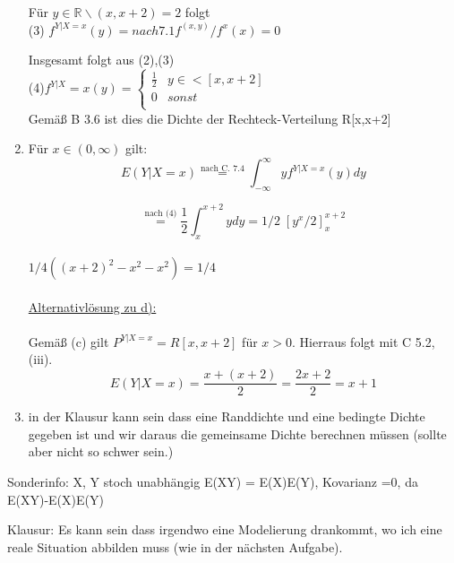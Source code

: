\documentclass[10pt,a4paper]{article}
\begin{document}
\begin{enumerate}[label=(\alph*)]
Für $y \in \mathbb{R} \backslash  (x, x+2) = 2$ folgt\\
(3) $f^{Y|X=x}(y) = nach 7.1 f^(x,y)/f^x(x) = 0$

Insgesamt folgt aus (2),(3)\\

(4)$f^{Y|X}=x(y) =  \begin{cases}
	\frac{1}{2} &  y \in <[x,x+2]\\
	0 & sonst\\
\end{cases}$\\

Gemäß B 3.6 ist dies die Dichte der Rechteck-Verteilung R[x,x+2]

\item Für $x\in (0,\infty)$ gilt:\\
$$E(Y|X=x) \overset{\text{nach C. 7.4}}{=}  \int_{-\infty}^{\infty} y f^{Y|X=x}(y)dy$$

$$\overset{\text{nach (4)}}{=}  \frac{1}{2}  \int_{x}^{x+2}y dy = 1/2\;\left[y^x /2\right]^{x+2}_x $$\\

$1/4((x+2)^2-x^2 - x^2) =  1/4$\\~\\
\underline{Alternativlösung zu d):}\\~\\
 	Gemäß (c) gilt $P^{Y|X=x} = R[x,x+2]$ für $x>0$. Hierraus folgt mit C 5.2, (iii). $$E(Y|X=x) = \frac{x+(x+2)}{2} = \frac{2x+2}{2}=x+1$$
	
	\item in der Klausur kann sein dass eine Randdichte und eine bedingte Dichte gegeben ist und wir daraus die gemeinsame Dichte berechnen müssen (sollte aber nicht so schwer sein.)
\end{enumerate}


Sonderinfo: X, Y stoch unabhängig E(XY) =  E(X)E(Y), Kovarianz =0, da E(XY)-E(X)E(Y)

Klausur: Es kann sein dass irgendwo eine Modelierung drankommt, wo ich eine reale Situation abbilden muss (wie in der nächsten Aufgabe).
\end{document}
